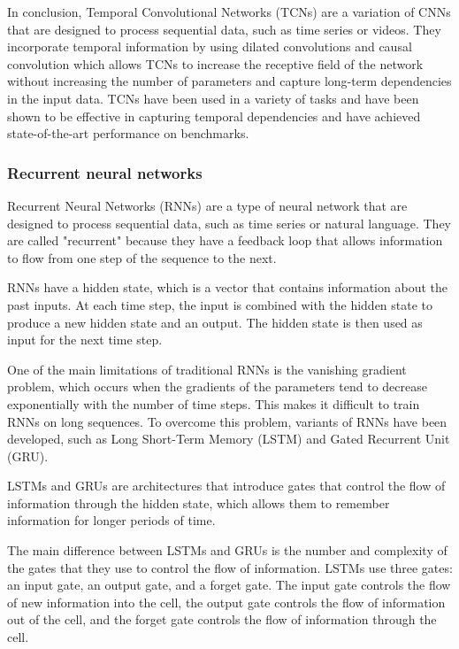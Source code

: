 In conclusion, Temporal Convolutional Networks (TCNs) are a variation of CNNs that are designed to process sequential data, such as time series or videos.
They incorporate temporal information by using dilated convolutions and causal convolution which allows TCNs to increase the receptive field of the network without increasing the number of parameters and capture long-term dependencies in the input data.
TCNs have been used in a variety of tasks and have been shown to be effective in capturing temporal dependencies and have achieved state-of-the-art performance on benchmarks.


\subsubsection{Recurrent neural networks}

Recurrent Neural Networks (RNNs) are a type of neural network that are designed to process sequential data, such as time series or natural language.
They are called "recurrent" because they have a feedback loop that allows information to flow from one step of the sequence to the next.

RNNs have a hidden state, which is a vector that contains information about the past inputs.
At each time step, the input is combined with the hidden state to produce a new hidden state and an output.
The hidden state is then used as input for the next time step.

One of the main limitations of traditional RNNs is the vanishing gradient problem, which occurs when the gradients of the parameters tend to decrease exponentially with the number of time steps.
This makes it difficult to train RNNs on long sequences.
To overcome this problem, variants of RNNs have been developed, such as Long Short-Term Memory (LSTM) and Gated Recurrent Unit (GRU).

LSTMs and GRUs are architectures that introduce gates that control the flow of information through the hidden state, which allows them to remember information for longer periods of time. 

The main difference between LSTMs and GRUs is the number and complexity of the gates that they use to control the flow of information.
LSTMs use three gates: an input gate, an output gate, and a forget gate.
The input gate controls the flow of new information into the cell, the output gate controls the flow of information out of the cell, and the forget gate controls the flow of information through the cell.

